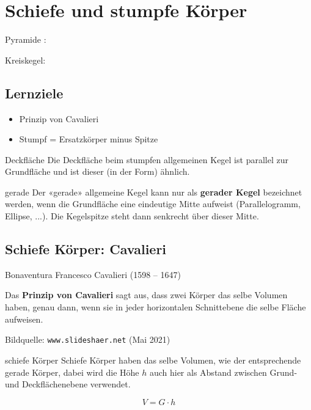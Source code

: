 \section{Schiefe und stumpfe Körper}

Pyramide : 

Kreiskegel: 

\subsection*{Lernziele}
\begin{itemize}
\item Prinzip von Cavalieri
\item Stumpf = Ersatzkörper minus Spitze
\end{itemize}


\begin{bemerkung}{Deckfläche}{}
Die Deckfläche beim stumpfen allgemeinen Kegel ist parallel zur
Grundfläche und ist dieser (in der Form) ähnlich.
\end{bemerkung}

\begin{bemerkung}{gerade}{}
  Der «gerade» allgemeine Kegel kann nur als \textbf{gerader Kegel}
  bezeichnet werden, wenn die Grundfläche eine eindeutige Mitte
  aufweist (Parallelogramm, Ellipse, ...). Die Kegelspitze steht dann senkrecht über dieser Mitte.
\end{bemerkung}
  \newpage


\subsection{Schiefe Körper: Cavalieri}
Bonaventura Francesco Cavalieri (1598 – 1647)

Das \textbf{Prinzip von Cavalieri} sagt aus, dass zwei Körper das
selbe Volumen haben, genau dann, wenn sie in jeder horizontalen
Schnittebene die selbe Fläche aufweisen.

Bildquelle: \texttt{www.slideshaer.net} (Mai 2021)
\vspace{9mm}

\begin{gesetz}{schiefe Körper}{}
  Schiefe Körper haben das selbe Volumen, wie der entsprechende gerade Körper, dabei wird die Höhe $h$ auch hier als Abstand zwischen Grund- und Deckflächenebene verwendet.

  $$V = G\cdot{} h$$
\end{gesetz}


